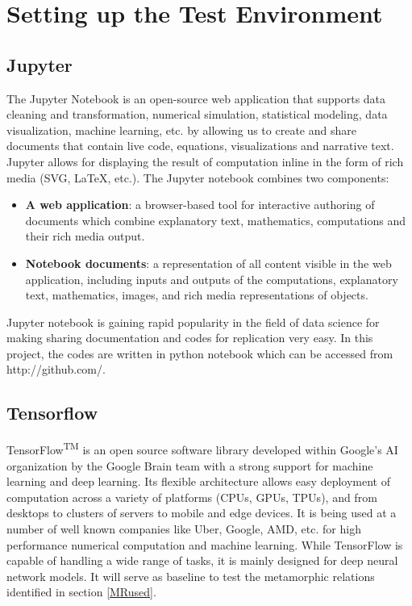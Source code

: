 \section{Setting up the Test Environment}
\subsection{Jupyter}
The Jupyter Notebook is an open-source web application that supports data cleaning and transformation, numerical simulation, statistical modeling, data visualization, machine learning, etc. by allowing us to create and share documents that contain live code, equations, visualizations and narrative text. Jupyter allows for displaying the result of computation inline in the form of rich media (SVG, LaTeX, etc.). The Jupyter notebook combines two components:
\begin{itemize}
  \item \textbf{A web application}: a browser-based tool for interactive authoring of documents which combine explanatory text, mathematics, computations and their rich media output.
  \item \textbf{Notebook documents}: a representation of all content visible in the web application, including inputs and outputs of the computations, explanatory text, mathematics, images, and rich media representations of objects.
\end{itemize}
Jupyter notebook is gaining rapid popularity in the field of data science for making sharing documentation and codes for replication very easy. In this project, the codes are written in python notebook which can be accessed from http://github.com/.

\subsection{Tensorflow}
TensorFlow\textsuperscript{TM} is an open source software library developed within Google’s AI organization by the Google Brain team with a strong support for machine learning and deep learning. Its flexible architecture allows easy deployment of computation across a variety of platforms (CPUs, GPUs, TPUs), and from desktops to clusters of servers to mobile and edge devices. It is being used at a number of well known companies like Uber, Google, AMD, etc. for high performance numerical computation and machine learning. While TensorFlow is capable of handling a wide range of tasks, it is mainly designed for deep neural network models. It will serve as baseline to test the metamorphic relations identified in section \ref{MRused}.

